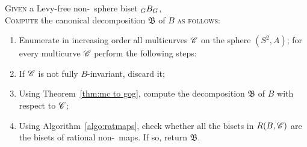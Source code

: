 \documentclass{amsart}
\begin{document}
\begin{algo}\label{algo:canonical}
  \textsc{Given} a Levy-free non-\Tor\ sphere biset $\subscript G B_G$,\\
  \textsc{Compute} the canonical decomposition $\mathfrak B$ of $B$ \textsc{ as follows:}\\
  \begin{enumerate}
  \item Enumerate in increasing order all multicurves ${\mathscr C}$ on the
    sphere $(S^2,A)$; for every multicurve ${\mathscr C}$ perform the following
    steps:
  \item If ${\mathscr C}$ is not fully $B$-invariant, discard it;
  \item Using Theorem~\ref{thm:mc to gog}, compute the decomposition
    $\mathfrak B$ of $B$ with respect to ${\mathscr C}$;
  \item Using Algorithm~\ref{algo:ratmaps}, check whether all the
    bisets in $R(B,{\mathscr C})$ are the bisets of rational non-\Tor~maps. If
    so, return $\mathfrak B$.\label{st:5:algo:canonical}
  \end{enumerate}
\end{algo}
\end{document}

